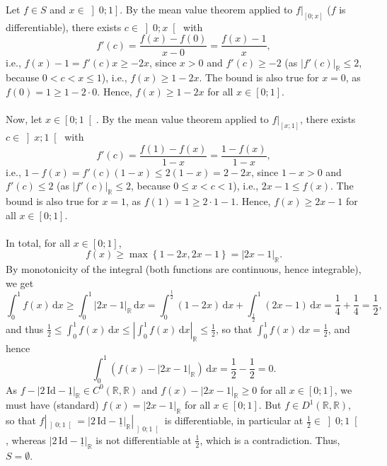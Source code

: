\begin{solution}
    Let \( f \in S \) and \( x \in \left]0;1\right] \). By the mean value theorem applied to \( f|_{\left[0;x\right]} \) (\( f \) is differentiable), there exists \( c \in \left]0;x\right[ \) with
    \[
        f'\left(c\right) = \frac{f\left(x\right)-f\left(0\right)}{x-0} = \frac{f\left(x\right)-1}{x},
    \]
    i.e., \( f\left(x\right)-1 = f'\left(c\right)x \geq -2x \), since \( x > 0 \) and \( f'\left(c\right) \geq -2 \) (as \( \left|f'\left(c\right)\right|_{\mathbb{R}} \leq 2 \), because \( 0 < c < x \leq 1 \)), i.e., \( f\left(x\right) \geq 1-2x \). The bound is also true for \( x = 0 \), as \( f\left(0\right) = 1 \geq 1-2 \cdot 0 \). Hence, \( f\left(x\right) \geq 1-2x \) for all \( x \in \left[0;1\right] \).
    \\\\
    Now, let \( x \in \left[0;1\right[ \). By the mean value theorem applied to \( f|_{\left[x;1\right]} \), there exists \( c \in \left]x;1\right[ \) with
    \[
        f'\left(c\right) = \frac{f\left(1\right)-f\left(x\right)}{1-x} = \frac{1-f\left(x\right)}{1-x},
    \]
    i.e., \( 1-f\left(x\right) = f'\left(c\right)\left(1-x\right) \leq 2\left(1-x\right) = 2-2x \), since \( 1-x > 0 \) and \( f'\left(c\right) \leq 2 \) (as \( \left|f'\left(c\right)\right|_{\mathbb{R}} \leq 2 \), because \( 0 \leq x < c < 1 \)), i.e., \( 2x-1 \leq f\left(x\right) \). The bound is also true for \( x = 1 \), as \( f\left(1\right) = 1 \geq 2 \cdot 1-1 \). Hence, \( f\left(x\right) \geq 2x-1 \) for all \( x \in \left[0;1\right] \).
    \\\\
    In total, for all \( x \in \left[0;1\right] \),
    \[
        f\left(x\right) \geq \max\left\{1-2x, 2x-1\right\} = \left|2x-1\right|_{\mathbb{R}}.
    \]
    By monotonicity of the integral (both functions are continuous, hence integrable), we get
    \[
        \int_0^1 f\left(x\right) \,\mathrm{d}x \geq \int_0^1 \left|2x-1\right|_{\mathbb{R}} \,\mathrm{d}x = \int_0^{\frac{1}{2}} \left(1-2x\right) \,\mathrm{d}x+\int_{\frac{1}{2}}^1 \left(2x-1\right) \,\mathrm{d}x = \frac{1}{4}+\frac{1}{4} = \frac{1}{2},
    \]
    and thus \( \frac{1}{2} \leq \int_0^1 f\left(x\right) \,\mathrm{d}x \leq \left|\int_0^1 f\left(x\right) \,\mathrm{d}x\right|_{\mathbb{R}} \leq \frac{1}{2} \), so that \( \int_0^1 f\left(x\right) \,\mathrm{d}x = \frac{1}{2} \), and hence
    \[
        \int_0^1 \left(f\left(x\right)-\left|2x-1\right|_{\mathbb{R}}\right) \,\mathrm{d}x = \frac{1}{2}-\frac{1}{2}=0.
    \]
    As \( f-\left|2\,\mathrm{Id}-\underline{1}\right|_{\mathbb{R}} \in C^0\left(\mathbb{R},\mathbb{R}\right) \) and \( f\left(x\right)-\left|2x-1\right|_{\mathbb{R}} \geq 0 \) for all \( x \in \left[0;1\right] \), we must have (standard) \( f\left(x\right) = \left|2x-1\right|_{\mathbb{R}} \) for all \( x \in \left[0;1\right] \). But \( f \in D^1\left(\mathbb{R},\mathbb{R}\right) \), so that \( f|_{\left]0;1\right[} = \left|2\,\mathrm{Id}-\underline{1}\right|_{\mathbb{R}}|_{\left]0;1\right[} \) is differentiable, in particular at \( \frac{1}{2} \in \left]0;1\right[ \), whereas \( \left|2\,\mathrm{Id}-\underline{1}\right|_{\mathbb{R}} \) is not differentiable at \( \frac{1}{2} \), which is a contradiction. Thus, \( S = \emptyset \).
\end{solution}
